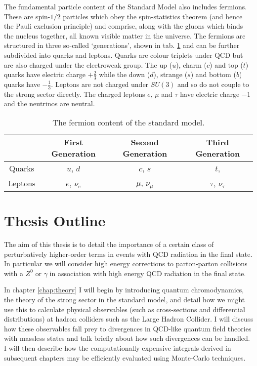 	The fundamental particle content of the Standard Model also includes fermions. These are spin-$1/2$
	particles which obey the spin-statistics theorem (and hence the Pauli exclusion principle) and
	comprise, along with the gluons which binds the nucleus together, all known visible matter in the
	universe. The fermions are structured in three so-called `generations', shown in tab. \ref{tab:fermions}
	and can be further subdivided into quarks and leptons. Quarks are colour triplets under QCD but are
	also charged under the electroweak group.  The up ($u$), charm ($c$) and top ($t$) quarks have electric
	charge $+\frac{2}{3}$ while the down ($d$), strange ($s$) and bottom ($b$) quarks have $-\frac{1}{3}$.
	Leptons are not charged under $SU(3)$ and so do not couple to the strong sector directly.  The charged leptons
	$e$, $\mu$ and $\tau$ have electric charge $-1$ and the neutrinos are neutral.

	\begin{table}[hbt!]
	\begin{center}
	\begin{tabular}{c | c | c | c}
	        & First Generation & Second Generation & Third Generation   \\ \hline
	Quarks  &  $u$, $d$        & $c$, $s$          & $t$,               \\ \hline
	Leptons &  $e$, $\nu_e$    & $\mu$, $\nu_\mu$  & $\tau$, $\nu_\tau$ \\
	\end{tabular}
	\caption{The fermion content of the standard model.}
	\label{tab:fermions}
	\end{center}
	\end{table}

\section{Thesis Outline}
	\label{sec:outline}

	The aim of this thesis is to detail the importance of a certain class of perturbatively higher-order terms
	in events with QCD radiation in the final state.  In particular we will consider high energy corrections to parton-parton
	collisions with a $Z^0$ or $\gamma$ in association with high energy QCD radiation in the final state.

	In chapter \ref{chap:theory} I will begin by introducing quantum chromodynamics, the theory of the strong
	sector in the standard model, and detail how we might use this to calculate physical observables (such as
	cross-sections and differential distributions) at hadron colliders such as the Large Hadron Collider.  I
	will discuss how these observables fall prey to divergences in QCD-like quantum field theories with massless
	states and talk briefly about how such divergences can be handled.  I will then describe how the computationally
	expensive integrals derived in subsequent chapters may be efficiently evaluated using Monte-Carlo techniques.

